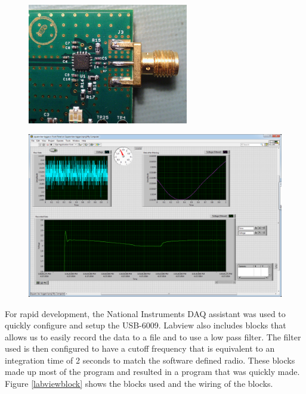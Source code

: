 {\begin{figure}[h!tb] \centering
\includegraphics[width=7cm]{Images/adl5902.jpg}
\label{square_law}
\end{figure}
}

{\begin{figure}[h!tb] \centering
\includegraphics[width=\textwidth]{Images/labviewGUI.png}
\label{labviewgui}
\end{figure}
}

For rapid development, the National Instruments DAQ assistant was used to quickly configure and setup the USB-6009.  Labview also includes blocks that allows us to easily record the data to a file and to use a low pass filter.  The filter used is then configured to have a cutoff frequency that is equivalent to an integration time of 2 seconds to match the software defined radio.  These blocks made up most of the program and resulted in a program that was quickly made.  Figure \ref{labviewblock} shows the blocks used and the wiring of the blocks.

